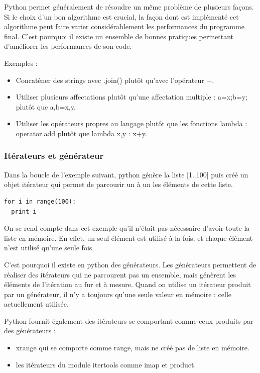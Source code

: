 \documentclass[a4paper]{article}
\begin{document}
Python permet généralement de résoudre un même problème de plusieurs
façons. Si le choix d'un bon algorithme est crucial, la façon dont est
implémenté cet algorithme peut faire varier considérablement les
performances du programme final. C'est pourquoi il existe un ensemble
de bonnes pratiques permettant d'améliorer les performances de son
code\cite{PythonSpeed}.


Exemples :
\begin{itemize}
\item Concaténer des strings avec .join() plutôt qu'avec l'opérateur +.
\item Utiliser plusieurs affectations plutôt qu'une affectation
  multiple : a=x;b=y; plutôt que a,b=x,y.
\item Utiliser les opérateurs propres au langage plutôt que les
  fonctions lambda : operator.add plutôt que lambda x,y : x+y.
\end{itemize}

\subsubsection{Itérateurs et générateur}

Dans la boucle de l'exemple suivant, python génère la liste [1..100]
puis créé un objet itérateur qui permet de parcourir un à un les
éléments de cette liste.

\begin{verbatim}
for i in range(100):
  print i
\end{verbatim}

On se rend compte dans cet exemple qu'il n'était pas nécessaire
d'avoir toute la liste en mémoire. En effet, un seul élément est
utilisé à la fois, et chaque élément n'est utilisé qu'une seule fois.

C'est pourquoi il existe en python des générateurs. Les générateurs
permettent de réaliser des itérateurs qui ne parcourent pas un
ensemble, mais génèrent les éléments de l'itération au fur et à
mesure. Quand on utilise un itérateur produit par un générateur, il
n'y a toujours qu'une seule valeur en mémoire : celle actuellement
utilisée.

Python fournit également des itérateurs se comportant comme ceux
produits par des générateurs :

\begin{itemize}
\item xrange qui se comporte comme range, mais ne créé pas de liste en
  mémoire.
\item les itérateurs du module itertools comme imap et product.
\end{itemize}
\end{document}
